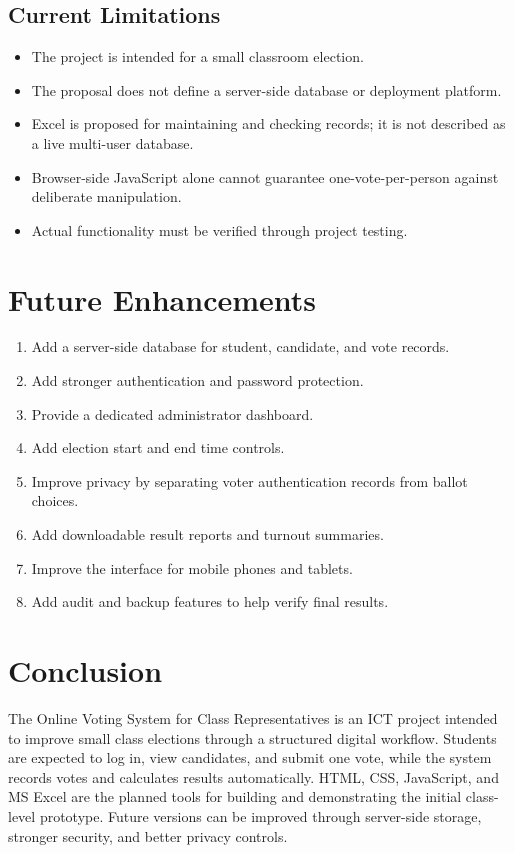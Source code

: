 \documentclass[12pt,a4paper]{report}
\begin{document}
\section{Current Limitations}
\begin{itemize}
\item The project is intended for a small classroom election.
\item The proposal does not define a server-side database or deployment platform.
\item Excel is proposed for maintaining and checking records; it is not described as a live multi-user database.
\item Browser-side JavaScript alone cannot guarantee one-vote-per-person against deliberate manipulation.
\item Actual functionality must be verified through project testing.
\end{itemize}

\chapter{Future Enhancements}
\begin{enumerate}
\item Add a server-side database for student, candidate, and vote records.
\item Add stronger authentication and password protection.
\item Provide a dedicated administrator dashboard.
\item Add election start and end time controls.
\item Improve privacy by separating voter authentication records from ballot choices.
\item Add downloadable result reports and turnout summaries.
\item Improve the interface for mobile phones and tablets.
\item Add audit and backup features to help verify final results.
\end{enumerate}

\chapter{Conclusion}
The Online Voting System for Class Representatives is an ICT project intended to improve small class elections through a structured digital workflow. Students are expected to log in, view candidates, and submit one vote, while the system records votes and calculates results automatically. HTML, CSS, JavaScript, and MS Excel are the planned tools for building and demonstrating the initial class-level prototype. Future versions can be improved through server-side storage, stronger security, and better privacy controls.
\end{document}

